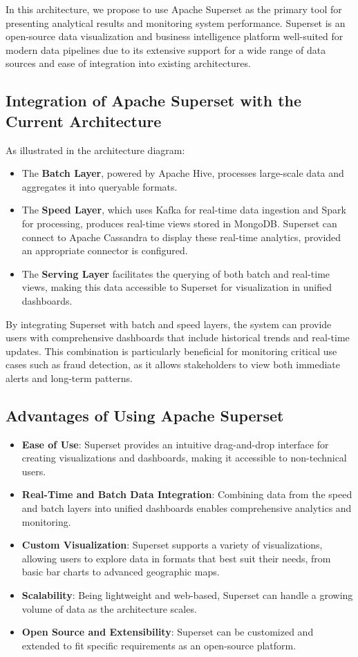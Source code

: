 \documentclass[12pt,a4paper, hidelinks]{article}
\begin{document}
In this architecture, we propose to use Apache Superset as the primary tool for presenting analytical results and monitoring system performance. Superset is an open-source data visualization and business intelligence platform well-suited for modern data pipelines due to its extensive support for a wide range of data sources and ease of integration into existing architectures.

\subsection{Integration of Apache Superset with the Current Architecture}
As illustrated in the architecture diagram:
\begin{itemize}
    \item The \textbf{Batch Layer}, powered by Apache Hive, processes large-scale data and aggregates it into queryable formats.
    \item The \textbf{Speed Layer}, which uses Kafka for real-time data ingestion and Spark for processing, produces real-time views stored in MongoDB. Superset can connect to Apache Cassandra to display these real-time analytics, provided an appropriate connector is configured.
    \item The \textbf{Serving Layer} facilitates the querying of both batch and real-time views, making this data accessible to Superset for visualization in unified dashboards.
\end{itemize}

By integrating Superset with batch and speed layers, the system can provide users with comprehensive dashboards that include historical trends and real-time updates. This combination is particularly beneficial for monitoring critical use cases such as fraud detection, as it allows stakeholders to view both immediate alerts and long-term patterns.

\subsection{Advantages of Using Apache Superset}
\begin{itemize}
    \item \textbf{Ease of Use}: Superset provides an intuitive drag-and-drop interface for creating visualizations and dashboards, making it accessible to non-technical users.
    \item \textbf{Real-Time and Batch Data Integration}: Combining data from the speed and batch layers into unified dashboards enables comprehensive analytics and monitoring.
    \item \textbf{Custom Visualization}: Superset supports a variety of visualizations, allowing users to explore data in formats that best suit their needs, from basic bar charts to advanced geographic maps.
    \item \textbf{Scalability}: Being lightweight and web-based, Superset can handle a growing volume of data as the architecture scales.
    \item \textbf{Open Source and Extensibility}: Superset can be customized and extended to fit specific requirements as an open-source platform.
\end{itemize}
\end{document}
